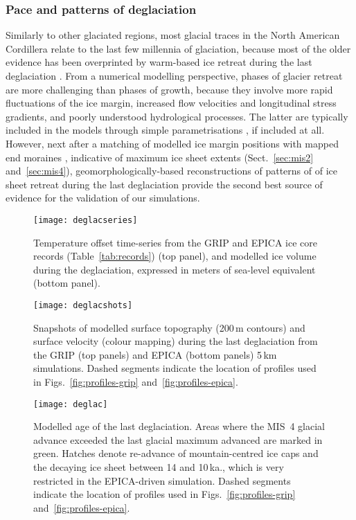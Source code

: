 \documentclass[tc]{copernicus}
\begin{document}
\subsubsection{Pace and patterns of deglaciation}

Similarly to other glaciated regions, most glacial traces in the North American
Cordillera relate to the last few millennia of glaciation, because most of the
older evidence has been overprinted by warm-based ice retreat
during the last deglaciation \citep{Kleman.1994, Kleman.etal.2010}. From a
numerical modelling perspective, phases of glacier retreat are more challenging
than phases of growth, because they involve more rapid fluctuations of the ice
margin, increased flow velocities and longitudinal stress gradients, and poorly
understood hydrological processes. The latter are typically included in the
models through simple parametrisations \citep[e.g.][]{Clason.etal.2012,
Clason.etal.2014, Bueler.Pelt.2014}, if included at all. However, next after a
matching of modelled ice margin positions with mapped end moraines
\citep{Napieralski.etal.2007}, indicative of maximum ice sheet extents
(Sect.~\ref{sec:mis2} and~\ref{sec:mis4}), geomorphologically-based
reconstructions of patterns of of ice sheet retreat during the last
deglaciation provide the second best source of evidence for the validation of
our simulations.

\begin{figure}
  \texttt{[image: deglacseries]}
  \caption{Temperature offset time-series from the GRIP and EPICA ice core
           records (Table~\ref{tab:records}) (top panel), and modelled ice
           volume during the deglaciation, expressed in meters of sea-level
           equivalent (bottom panel).}
  \label{fig:deglacseries}
\end{figure}

\begin{figure*}
  \texttt{[image: deglacshots]}
  \caption{Snapshots of modelled surface topography (200\,m contours)
           and surface velocity (colour mapping) during the last deglaciation
           from the GRIP (top panels) and EPICA (bottom panels) 5\,km simulations.
           Dashed segments indicate the location of profiles used in
           Figs.~\ref{fig:profiles-grip} and~\ref{fig:profiles-epica}.}
  \label{fig:deglacshots}
\end{figure*}

\begin{figure*}
  \vspace{-1.5mm}  %
  \texttt{[image: deglac]}
  \caption{Modelled age of the last deglaciation. Areas where the MIS~4 glacial
           advance exceeded the last glacial maximum advanced are marked in
           green. Hatches denote re-advance of mountain-centred ice caps and
           the decaying ice sheet between 14 and 10\,ka., which is very
           restricted in the EPICA-driven simulation.
           Dashed segments indicate the location of profiles used in
           Figs.~\ref{fig:profiles-grip} and~\ref{fig:profiles-epica}.}
  \label{fig:deglac}
\end{figure*}
\end{document}
